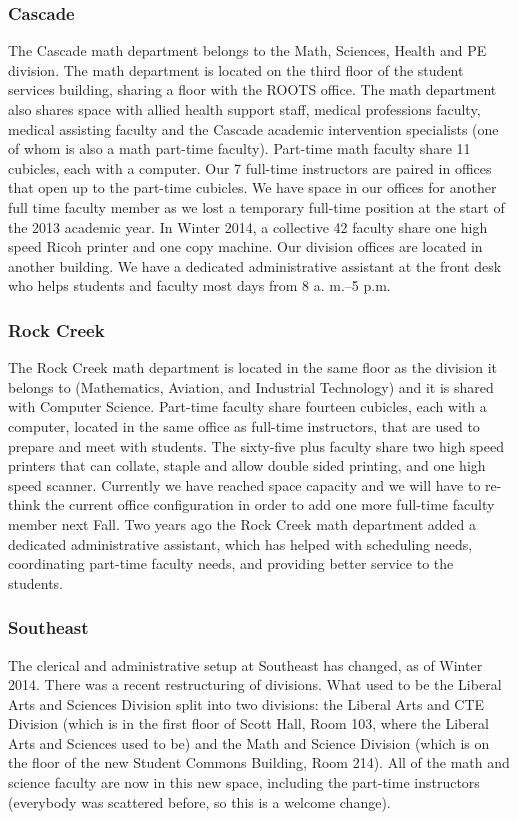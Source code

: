 \subsubsection{Cascade}
The Cascade math department belongs to the Math, Sciences, Health and PE division.
The math department is located on the third floor of the student services building, sharing a floor with the ROOTS office.
The math department also shares space with allied health support staff, medical professions faculty, medical assisting faculty and the Cascade academic intervention specialists (one of whom is also a math part-time faculty).
Part-time math faculty share 11 cubicles, each with a computer.
Our 7 full-time instructors are paired in offices that open up to the part-time cubicles.
We have space in our offices for another full time faculty member as we lost a temporary full-time position at the start of the 2013 academic year.
In Winter 2014, a collective 42 faculty share one high speed Ricoh printer and one copy machine.
Our division offices are located in another building.
We have a dedicated administrative assistant at the front desk who helps students and faculty most days from 8 {\sc a.
		m.--5 p.m.}

\subsubsection{Rock Creek}
The Rock Creek math department is located in the same floor as the division it belongs to (Mathematics, Aviation, and Industrial Technology) and it is shared with Computer Science.
Part-time faculty share fourteen cubicles, each with a computer, located in the same office as full-time instructors, that are used to prepare and meet with students.
The sixty-five plus faculty share two high speed printers that can collate, staple and allow double sided printing, and one high speed scanner.
Currently we have reached space capacity and we will have to re-think the current office configuration in order to add one more full-time faculty member next Fall.
Two years ago the Rock Creek math department added a dedicated administrative assistant, which has helped with scheduling needs, coordinating part-time faculty needs, and providing better service to the students.

\subsubsection{Southeast}
The clerical and administrative setup at Southeast has changed, as of Winter 2014.
There was a recent restructuring of divisions.
What used to be the Liberal Arts and Sciences Division split into two divisions: the Liberal Arts and CTE Division (which is in the first floor of Scott Hall, Room 103, where the Liberal Arts and Sciences used to be) and the Math and Science Division (which is on the  floor of the new Student Commons Building, Room 214).
All of the math and science faculty are now in this new space, including the part-time instructors (everybody was scattered before, so this is a welcome change).

